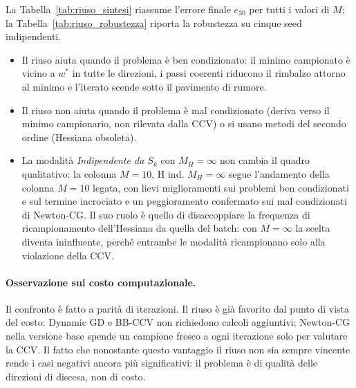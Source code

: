 La Tabella~\ref{tab:riuso_sintesi} riassume l'errore finale $e_{30}$ per tutti
i valori di $M$; la Tabella~\ref{tab:riuso_robustezza} riporta la robustezza
su cinque seed indipendenti.

\begin{itemize}
\item Il riuso aiuta quando il problema è ben condizionato: il minimo
  campionato è vicino a $w^*$ in tutte le direzioni, i passi coerenti riducono
  il rimbalzo attorno al minimo e l'iterato scende sotto il pavimento di
  rumore.
\item Il riuso non aiuta quando il problema è mal condizionato
  (deriva verso il minimo campionario, non rilevata dalla CCV) o si usano
  metodi del secondo ordine (Hessiana obsoleta).
\item La modalità \emph{Indipendente da $S_k$} con $M_H=\infty$ non cambia il
  quadro qualitativo: la colonna $M{=}10$, H ind. $M_H{=}\infty$ segue
  l'andamento della colonna $M{=}10$ legata, con lievi miglioramenti sui
  problemi ben condizionati e sul termine incrociato e un peggioramento
  confermato sui mal condizionati di Newton-CG. Il suo ruolo è quello di
  disaccoppiare la frequenza di ricampionamento dell'Hessiana da quella del
  batch: con $M=\infty$ la scelta diventa ininfluente, perché entrambe le
  modalità ricampionano solo alla violazione della CCV.
\end{itemize}

\paragraph{Osservazione sul costo computazionale.}
Il confronto è fatto a parità di iterazioni. Il riuso è già favorito dal
punto di vista del costo: Dynamic GD e BB-CCV non richiedono calcoli
aggiuntivi; Newton-CG nella versione base spende un campione fresco a ogni
iterazione solo per valutare la CCV. Il fatto che nonostante questo vantaggio
il riuso non sia sempre vincente rende i casi negativi ancora più significativi:
il problema è di qualità delle direzioni di discesa, non di costo.


